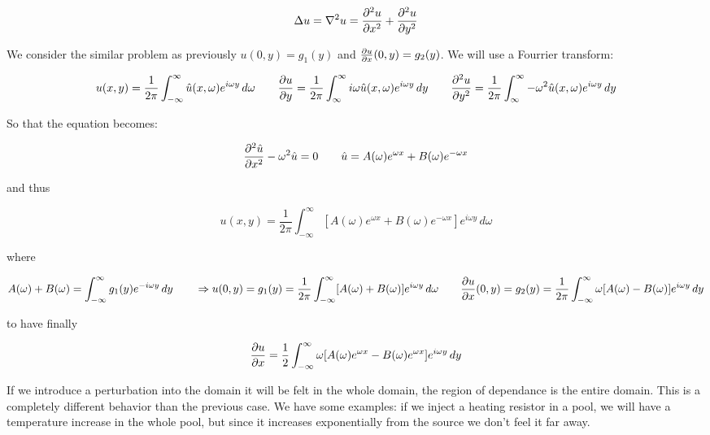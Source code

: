 \begin{equation}
\Delta u = \nabla ^2 u = \frac{\partial^2 u}{\partial x^2} + \frac{\partial^2 u}{\partial y^2}
\end{equation}

We consider the similar problem as previously $u(0,y) = g_1(y)$ and $\frac{\partial u}{\partial x} (0,y) = g_2 (y)$. We will use a Fourrier transform: 

\begin{equation}
u(x,y) = \frac{1}{2\pi}\int _{-\infty} ^\infty \hat{u} (x,\omega) e^{i\omega y} \, d\omega \qquad \frac{\partial u }{\partial y} = \frac{1}{2\pi} \int _{\infty} ^\infty   i \omega \hat{u} (x,\omega )e^{i\omega y} \, dy \qquad \frac{\partial^2 u}{\partial y^2} = \frac{1}{2\pi} \int _{\infty} ^\infty   - \omega ^2\hat{u} (x,\omega )e^{i\omega y} \, dy
\end{equation}

So that the equation becomes: 

\begin{equation}
\frac{\partial ^2 \hat{u}}{\partial x^2} - \omega ^2 \hat{u} = 0 \qquad \hat{u} = A(\omega) e^{\omega x} + B(\omega) e^{-\omega x}
\end{equation}

and thus 

\begin{equation}
u(x,y) = \frac{1}{2\pi } \int _{-\infty} ^\infty \left[A(\omega ) e^{\omega x} + B(\omega ) e^{-\omega x} \right] e^{i\omega y} \, d\omega
\end{equation}

where 

\begin{equation}
A(\omega) +B(\omega ) = \int _{-\infty} ^{\infty} g_1(y) e^{-i\omega y} \, dy \qquad \Rightarrow u(0, y) = g_1(y) = \frac{1}{2\pi} \int _{-\infty} ^{\infty} [A(\omega) + B(\omega)] e^{i\omega y} \, d\omega \qquad \frac{\partial u}{\partial x} (0,y) = g_2(y) = \frac{1}{2\pi} \int _{-\infty }^{\infty} \omega [A(\omega) - B(\omega) ]e^{i\omega y} \, dy
\end{equation}

to have finally 

\begin{equation}
\frac{\partial u}{\partial x} = \frac{1}{2} \int _{-\infty} ^\infty \omega [A(\omega) e^{\omega x}-B(\omega) e^{\omega x}] e^{i\omega y}\, dy
\end{equation}

If we introduce a perturbation into the domain it will be felt in the whole domain, the region of dependance is the entire domain. This is a completely different behavior than the previous case. We have some examples: if we inject a heating resistor in a pool, we will have a temperature increase in the whole pool, but since it increases exponentially from the source we don't feel it far away. 

